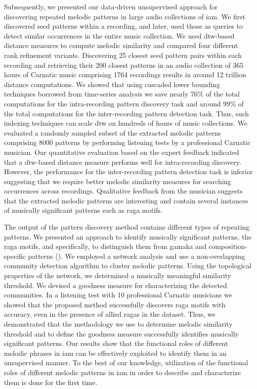 {Subsequently, we presented our data-driven unsupervised approach for discovering repeated melodic patterns in large audio collections of \gls{iam}. We first discovered seed patterns within a recording, and later, used those as queries to detect similar occurrences in the entire music collection. We used \gls{dtw}-based distance measures to compute melodic similarity and compared four different rank refinement variants. Discovering 25 closest seed pattern pairs within each recording and retrieving their 200 closest patterns in an audio collection of 365\,hours of Carnatic music comprising 1764 recordings results in around 12 trillion distance computations. We showed that using cascaded lower bounding techniques borrowed from time-series analysis we save nearly 76\% of the total computations for the intra-recording pattern discovery task and around 99\% of the total computations for the inter-recording pattern detection task. Thus, such indexing techniques can scale \gls{dtw} on hundreds of hours of music collections. We evaluated a randomly sampled subset of the extracted melodic patterns comprising 8000 patterns by performing listening tests by a professional Carnatic musician. Our quantitative evaluation based on the expert feedback indicated that a \gls{dtw}-based distance measure performs well for intra-recording discovery. However, the performance for the inter-recording pattern detection task is inferior suggesting that we require better melodic similarity measures for searching occurrences across recordings. Qualitative feedback from the musician suggests that the extracted melodic patterns are interesting and contain several instances of musically significant patterns such as \gls{raga} motifs. 

The output of the pattern discovery method contains different types of repeating patterns. We presented an approach to identify musically significant patterns, the \gls{raga} motifs, and specifically, to distinguish them from \gls{gamaka} and composition-specific patterns ().  We employed a network analysis and  use a non-overlapping community detection algorithm to cluster melodic patterns. Using the topological properties of the network, we determined a musically meaningful similarity threshold. We devised a goodness measure for characterizing the detected communities. In a listening test with 10 professional Carnatic musicians we showed that the proposed method successfully discovers \gls{raga} motifs with accuracy, even in the presence of allied \glspl{raga} in the dataset. Thus, we demonstrated that the methodology we use to determine melodic similarity threshold and to define the goodness measure successfully identifies musically significant patterns.  Our results show that the functional roles of different melodic phrases in \gls{iam} can be effectively exploited to identify them in an unsupervised manner. To the best of our knowledge, utilization of the functional roles of different melodic patterns in \gls{iam} in order to describe and characterize them is done for the first time.

}
